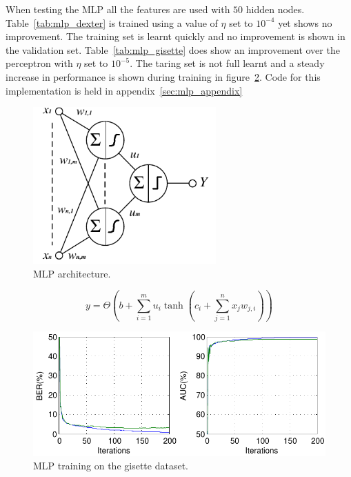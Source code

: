 \documentclass{ecsarticle}     %
\begin{document}
When testing the MLP all the features are used with $50$ hidden nodes.
Table~\ref{tab:mlp_dexter} is trained using a value of $\eta$ set to $10^{-4}$ yet shows no improvement.
The training set is learnt quickly and no improvement is shown in the validation set.
Table~\ref{tab:mlp_gisette} does show an improvement over the perceptron with $\eta$ set to $10^{-5}$.
The taring set is not full learnt and a steady increase in performance is shown during training in figure~\ref{fig:mlp_train}.
Code for this implementation is held in appendix~\ref{sec:mlp_appendix}


\begin{figure}[ht]
   \centering
    \includegraphics[width = 7cm]{MLP.pdf}
   \caption{MLP architecture.}
   \label{fig:mlp}
\end{figure}

\begin{equation}
   y = \Theta \left(b + \sum_{i=1}^{m} u_i \tanh \left(c_i + \sum_{j=1}^{n} x_j w_{j,i}\right)  \right) 
   \label{eqn:mlp}
\end{equation}

\begin{figure}[ht]
   \centering
    \includegraphics[width = 14cm]{MLP_Train.pdf}
   \caption{MLP training on the gisette dataset.}
   \label{fig:mlp_train}
\end{figure}
\end{document}
